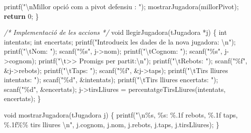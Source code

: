 \documentclass[
]{book}
\newenvironment{Shaded}{\begin{snugshade}}{\end{snugshade}}
\newcommand{\CommentTok}[1]{\textcolor[rgb]{0.56,0.35,0.01}{\textit{#1}}}
\newcommand{\ControlFlowTok}[1]{\textcolor[rgb]{0.13,0.29,0.53}{\textbf{#1}}}
\newcommand{\DataTypeTok}[1]{\textcolor[rgb]{0.13,0.29,0.53}{#1}}
\newcommand{\DecValTok}[1]{\textcolor[rgb]{0.00,0.00,0.81}{#1}}
\newcommand{\NormalTok}[1]{#1}
\newcommand{\SpecialCharTok}[1]{\textcolor[rgb]{0.00,0.00,0.00}{#1}}
\newcommand{\StringTok}[1]{\textcolor[rgb]{0.31,0.60,0.02}{#1}}
\begin{document}
\begin{Shaded}
\begin{Highlighting}[]
\NormalTok{    printf(}\StringTok{"}\SpecialCharTok{\textbackslash{}n}\StringTok{Millor opció com a pivot defensiu : "}\NormalTok{);}
\NormalTok{    mostrarJugadora(millorPivot);}
    \ControlFlowTok{return} \DecValTok{0}\NormalTok{;}
\NormalTok{\}}

\CommentTok{/* Implementació de les accions */}
\DataTypeTok{void}\NormalTok{ llegirJugadora(tJugadora *j) \{}
    \DataTypeTok{int}\NormalTok{ intentats;}
    \DataTypeTok{int}\NormalTok{ encertats;}
\NormalTok{    printf(}\StringTok{"Introdueix les dades de la nova jugadora: }\SpecialCharTok{\textbackslash{}n}\StringTok{"}\NormalTok{);}
\NormalTok{    printf(}\StringTok{"}\SpecialCharTok{\textbackslash{}t}\StringTok{Nom: "}\NormalTok{);}
\NormalTok{    scanf(}\StringTok{"\%s"}\NormalTok{, j{-}\textgreater{}nom);}
\NormalTok{    printf(}\StringTok{"}\SpecialCharTok{\textbackslash{}t}\StringTok{Cognom: "}\NormalTok{);}
\NormalTok{    scanf(}\StringTok{"\%s"}\NormalTok{, j{-}\textgreater{}cognom);}
\NormalTok{    printf(}\StringTok{"}\SpecialCharTok{\textbackslash{}t}\StringTok{\textgreater{}\textgreater{} Promigs per partit:}\SpecialCharTok{\textbackslash{}n}\StringTok{"}\NormalTok{);}
\NormalTok{    printf(}\StringTok{"}\SpecialCharTok{\textbackslash{}t}\StringTok{Rebots: "}\NormalTok{);}
\NormalTok{    scanf(}\StringTok{"\%f"}\NormalTok{, \&j{-}\textgreater{}rebots);}
\NormalTok{    printf(}\StringTok{"}\SpecialCharTok{\textbackslash{}t}\StringTok{Taps: "}\NormalTok{);}
\NormalTok{    scanf(}\StringTok{"\%f"}\NormalTok{, \&j{-}\textgreater{}taps);}
\NormalTok{    printf(}\StringTok{"}\SpecialCharTok{\textbackslash{}t}\StringTok{Tirs lliures intentats: "}\NormalTok{);}
\NormalTok{    scanf(}\StringTok{"\%d"}\NormalTok{, \&intentats);}
\NormalTok{    printf(}\StringTok{"}\SpecialCharTok{\textbackslash{}t}\StringTok{Tirs lliures encertats: "}\NormalTok{);}
\NormalTok{    scanf(}\StringTok{"\%d"}\NormalTok{, \&encertats);}
\NormalTok{    j{-}\textgreater{}tirsLliures = percentatgeTirsLliures(intentats, encertats);}
\NormalTok{\}}

\DataTypeTok{void}\NormalTok{ mostrarJugadora(tJugadora j) \{}
\NormalTok{    printf(}\StringTok{"}\SpecialCharTok{\textbackslash{}n}\StringTok{\%s, \%s: \%.1f rebots, \%.1f taps, \%.1f\%\% tirs lliures }\SpecialCharTok{\textbackslash{}n}\StringTok{"}\NormalTok{, j.cognom, j.nom, j.rebots, j.taps, j.tirsLliures);}
\NormalTok{\}}


\end{Highlighting}
\end{Shaded}
\end{document}

